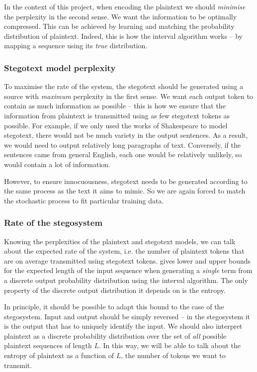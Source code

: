 \documentclass[draft]{IIBproject}
\makeatletter
\DeclareRobustCommand*{\ie}{i.e.\@\xspace}
\makeatother
\begin{document}
In the context of this project, when encoding the plaintext we should \emph{minimise} the perplexity in the second sense. We want the information to be optimally compressed. This can be achieved by learning and matching the probability distribution of plaintext. Indeed, this is how the interval algorithm works -- by mapping a sequence using its \emph{true} distribution.

\subsubsection{Stegotext model perplexity}

To maximise the rate of the system, the stegotext should be generated using a source with \emph{maximum} perplexity in the first sense. We want each output token to contain as much information as possible -- this is how we ensure that the information from plaintext is transmitted using as few stegotext tokens as possible. For example, if we only used the works of Shakespeare to model stegotext, there would not be much variety in the output sentences. As a result, we would need to output relatively long paragraphs of text. Conversely, if the sentences came from general English, each one would be relatively unlikely, so would contain a lot of information.

However, to ensure innocuousness, stegotext needs to be generated according to the same process as the text it aims to mimic. So we are again forced to match the stochastic process to fit particular training data.

\subsubsection{Rate of the stegosystem}

Knowing the perplexities of the plaintext and stegotext models, we can talk about the expected rate of the system, \ie the number of plaintext tokens that are on average transmitted using stegotext tokens. \cite{hanhoshi1997} gives lower and upper bounds for the expected length of the input sequence when generating a \emph{single} term from a discrete output probability distribution using the interval algorithm. The only property of the discrete output distribution it depends on is the entropy.

In principle, it should be possible to adapt this bound to the case of the stegosystem. Input and output should be simply reversed -- in the stegosystem it is the output that has to uniquely identify the input. We should also interpret plaintext as a discrete probability distribution over the set of \emph{all} possible plaintext sequences of length $L$. In this way, we will be able to talk about the entropy of plaintext as a function of $L$, the number of tokens we want to transmit.
\end{document}
